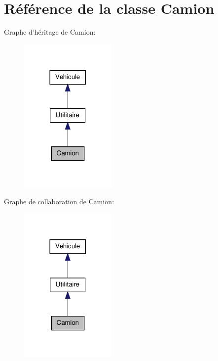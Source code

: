 \hypertarget{class_camion}{
\section{Référence de la classe Camion}
\label{class_camion}
}


Graphe d'héritage de Camion:
\nopagebreak
\begin{figure}[H]
\begin{center}
\leavevmode
\includegraphics[width=134pt]{class_camion__inherit__graph}
\end{center}
\end{figure}


Graphe de collaboration de Camion:
\nopagebreak
\begin{figure}[H]
\begin{center}
\leavevmode
\includegraphics[width=134pt]{class_camion__coll__graph}
\end{center}
\end{figure}
